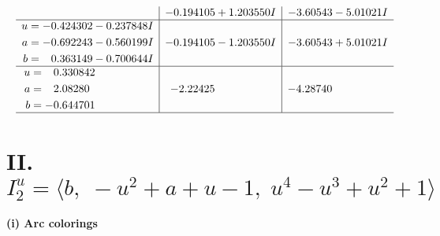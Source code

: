 \documentclass[1p]{elsarticle_modified}
\theoremstyle{definition}
\begin{document}
$$\begin{array}{c|c|c}
 & -0.194105 + 1.203550 I & -3.60543 - 5.01021 I \\ \hline\begin{aligned}
u &= -0.424302 - 0.237848 I \\
a &= -0.692243 - 0.560199 I \\
b &= \phantom{-}0.363149 - 0.700644 I\end{aligned}
 & -0.194105 - 1.203550 I & -3.60543 + 5.01021 I \\ \hline\begin{aligned}
u &= \phantom{-}0.330842\phantom{ +0.000000I} \\
a &= \phantom{-}2.08280\phantom{ +0.000000I} \\
b &= -0.644701\phantom{ +0.000000I}\end{aligned}
 & -2.22425\phantom{ +0.000000I} & -4.28740\phantom{ +0.000000I}\\
 \hline 
 \end{array}$$\newpage\newpage\renewcommand{\arraystretch}{1}
\centering \section*{II. $I^u_{2}= \langle b,\;- u^2+a+u-1,\;u^4- u^3+u^2+1 \rangle$}
\flushleft \textbf{(i) Arc colorings}\\
\end{document}
